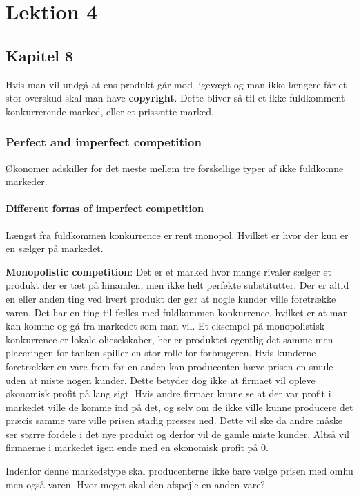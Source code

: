 \chapter{Lektion 4}

\section{Kapitel 8}

Hvis man vil undgå at ens produkt går mod ligevægt og man ikke længere får et stor overskud skal man have \textbf{copyright}. Dette bliver så til et ikke fuldkomment konkurrerende marked, eller et prissætte marked. 

\subsection{Perfect and imperfect competition}
Økonomer adskiller for det meste mellem tre forskellige typer af ikke fuldkomne markeder. 

\subsubsection{Different forms of imperfect competition}

Længst fra fuldkommen konkurrence er rent monopol. Hvilket er hvor der kun er en sælger på markedet. 

\textbf{Monopolistic competition}: Det er et marked hvor mange rivaler sælger et produkt der er tæt på hinanden, men ikke helt perfekte substitutter. Der er altid en eller anden ting ved hvert produkt der gør at nogle kunder ville foretrække varen. Det har en ting til fælles med fuldkommen konkurrence, hvilket er at man kan komme og gå fra markedet som man vil. Et eksempel på monopolistisk konkurrence er lokale olieselskaber, her er produktet egentlig det samme men placeringen for tanken spiller en stor rolle for forbrugeren. Hvis kunderne foretrækker en vare frem for en anden kan producenten hæve prisen en smule uden at miste nogen kunder. Dette betyder dog ikke at firmaet vil opleve økonomisk profit på lang sigt. Hvis andre firmaer kunne se at der var profit i markedet ville de komme ind på det, og selv om de ikke ville kunne producere det præcis samme vare ville prisen stadig presses ned. Dette vil ske da andre måske ser større fordele i det nye produkt og derfor vil de gamle miste kunder. Altså vil firmaerne i markedet igen ende med en økonomisk profit på 0.

Indenfor denne markedstype skal producenterne ikke bare vælge prisen med omhu men også varen. Hvor meget skal den afspejle en anden vare?

